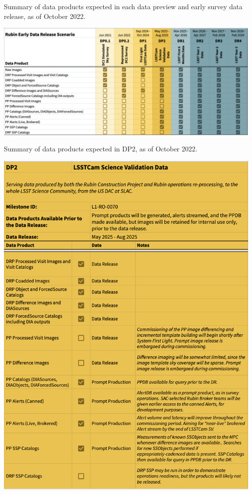 \begin{table}
\caption{Summary of data products expected in each data preview and early survey data release, as of October 2022.}
\label{tab:summary}
\includegraphics[width=\linewidth]{figures/DPR-summary}
\end{table}


\begin{table}
\caption{Summary of data products expected in DP2, as of October 2022.}
\label{tab:dp-two-products}
\includegraphics[width=\linewidth]{figures/DP2-products}
\end{table}

